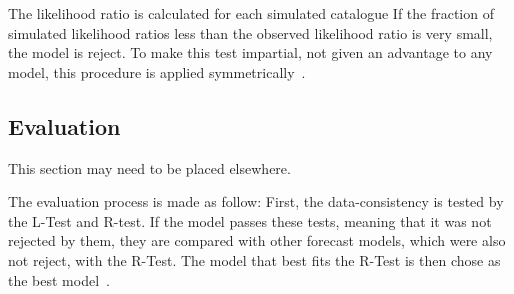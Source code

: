 The likelihood ratio is calculated for each simulated catalogue If the
fraction of simulated likelihood ratios less than the observed
likelihood ratio is very small, the model is reject.  To make this
test impartial, not given an advantage to any model, this procedure is
applied symmetrically~\cite{schorlemmer2010first}.\\


\subsection{Evaluation}\label{eval}
This section may need to be placed elsewhere.

The evaluation process is made as follow: First, the data-consistency
is tested by the L-Test and R-test. If the model passes these
tests, meaning that it was not rejected by them, they are compared
with other forecast models, which were also not reject, with the
R-Test. The model that best fits the R-Test is then chose as the best
model~\cite{schorlemmer2007earthquake}.\\
